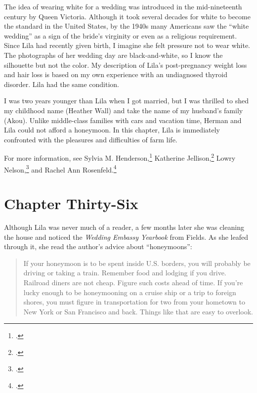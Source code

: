 \documentclass[
  american,
  letterpaper,
]{book}
\begin{document}
The idea of wearing white for a wedding was introduced in the
mid-nineteenth century by Queen Victoria. Although it took several
decades for white to become the standard in the United States, by the
1940s many Americans saw the ``white wedding'' as a sign of the bride's
virginity or even as a religious requirement. Since Lila had recently
given birth, I imagine she felt pressure not to wear white. The
photographs of her wedding day are black-and-white, so I know the
silhouette but not the color. My description of Lila's post-pregnancy
weight loss and hair loss is based on my own experience with an
undiagnosed thyroid disorder. Lila had the same condition.

I was two years younger than Lila when I got married, but I was thrilled
to shed my childhood name (Heather Wall) and take the name of my
husband's family (Akou). Unlike middle-class families with cars and
vacation time, Herman and Lila could not afford a honeymoon. In this
chapter, Lila is immediately confronted with the pleasures and
difficulties of farm life.

For more information, see Sylvia M. Henderson,\footnote{.} Katherine
Jellison,\footnote{.} Lowry Nelson,\footnote{.} and Rachel
Ann Rosenfeld.\footnote{.}


\chapter{Chapter Thirty-Six}\label{chapter-thirty-six}

Although Lila was never much of a reader, a few months later she was
cleaning the house and noticed the \emph{Wedding Embassy Yearbook} from
Fields. As she leafed through it, she read the author's advice about
``honeymoons'':

\begin{quote}
If your honeymoon is to be spent inside U.S. borders, you will probably
be driving or taking a train. Remember food and lodging if you drive.
Railroad diners are not cheap. Figure such costs ahead of time. If
you're lucky enough to be honeymooning on a cruise ship or a trip to
foreign shores, you must figure in transportation for two from your
hometown to New York or San Francisco and back. Things like that are
easy to overlook.
\end{quote}
\end{document}
